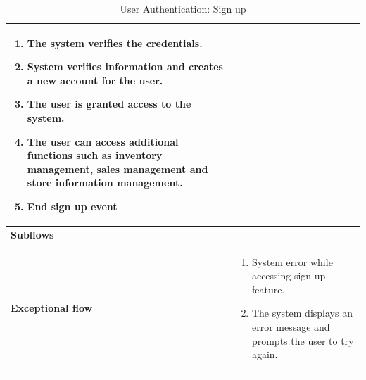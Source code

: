\documentclass[../thesis.tex]{subfiles}
\begin{document}
\begin{center}
\begin{table}[H]
{\begin{tabular}[htbp]{|p{}|p{}|}
\begin{enumerate}
                                                       \item The system verifies the credentials.
                                                       \item  System verifies information and creates a new account for the user.
                                                       \item  The user is granted access to the system.
                                                       \item The user can access additional functions such as inventory management, sales management and store information management.
                                                       \item End sign up event
                                                   \end{enumerate} \\ \hline
                \textbf{Subflows              }  &                                                                                                                                \\ \hline
                \textbf{Exceptional flow       } & \begin{enumerate}
                                                       \item System error while accessing sign up feature.
                                                       \item The system displays an error message and prompts the user to try again.
                                                   \end{enumerate}                                                   \\ \hline
            \end{tabular}%
        }
        \caption{User Authentication: Sign up}
        \label{tab:table-usecase-signup}


    \end{table}
\end{center}
\end{document}
